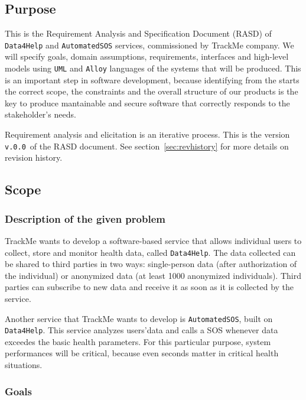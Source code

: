 \documentclass[12pt]{article}
\def \thisDocVersion {\texttt{v.0.0}}
\begin{document}
  \subsection{Purpose}

    This is the Requirement Analysis and Specification Document (RASD) of \texttt{Data4Help} and \texttt{AutomatedSOS} services, commissioned by TrackMe company. We will specify goals, domain assumptions, requirements, interfaces and high-level models using \texttt{UML} and \texttt{Alloy} languages of the systems that will be produced. This is an important step in software development, because identifying from the starts the correct scope, the constraints and the overall structure of our products is the key to produce mantainable and secure software that correctly responds to the stakeholder's needs.

    Requirement analysis and elicitation is an iterative process. This is the version \thisDocVersion\ of the RASD document. See section~\ref{sec:revhistory} for more details on revision history.

  \subsection{Scope}
  \subsubsection{Description of the given problem}
    TrackMe wants to develop a software-based service that allows individual users to collect, store and monitor health data, called \texttt{Data4Help}. The data collected can be shared to third parties in two ways: single-person data (after authorization of the individual) or anonymized data (at least 1000 anonymized individuals). Third parties can subscribe to new data and receive it as soon as it is collected by the service.

    Another service that TrackMe wants to develop is \texttt{AutomatedSOS}, built on \texttt{Data4Help}. This service analyzes users'data and calls a SOS whenever data exceedes the basic health parameters. For this particular purpose, system performances will be critical, because even seconds matter in critical health situations.


   \subsubsection{Goals}
\end{document}
